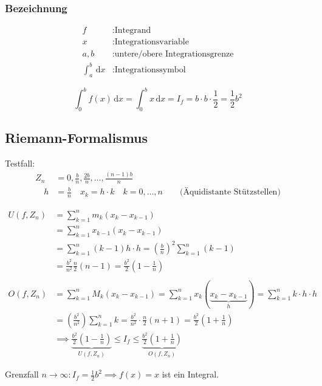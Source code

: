\subsubsection{Bezeichnung}
\begin{align*}
	f&: \text{Integrand} \\
	x&: \text{Integrationsvariable}\\
	a,b&: \text{untere/obere Integrationsgrenze}\\	
	\int_a^b \,\mathrm{d}x &:\text{Integrationssymbol}
\end{align*}

\begin{example}[f(x)=x in \lbrack0,b\rbrack]
	\[
		\int_0^b f(x) \,\mathrm{d}x = \int_0^b x \,\mathrm{d}x = I_f = b \cdot b \cdot \frac{1}{2} = \frac{1}{2} b^2
	\]
\end{example}


\subsection{Riemann-Formalismus}
Testfall:
\begin{align*}
	Z_n &= {0,\frac{b}{n},\frac{2b}{n},\ldots,\frac{(n-1)b}{n}} \\
	\quad h &= \frac{b}{n} \quad x_k=h \cdot k \quad k=0,\ldots,n \qquad \text{(Äquidistante Stützstellen)} 
\end{align*}

\begin{align*}
	U(f,Z_n) 
	&= \sum_{k=1}^n m_k(x_k-x_{k-1}) \\
	&= \sum_{k=1}^n x_{k-1}(x_k-x_{k-1}) \\
	&= \sum_{k=1}^n (k-1)h \cdot h = \left( \frac{b}{n} \right)^2 \sum_{k=1}^n (k-1) \\
	&= \frac{b^2}{n^2} \frac{n}{2}(n-1) = \frac{b^2}{2}(1-\frac{1}{n}) \\
	\\
	O(f,Z_n)
	&=\sum_{k=1}^n M_k(x_k-x_{k-1}) = \sum_{k=1}^n x_k(\underbrace{x_k-x_{k-1}}_{h}) = \sum_{k=1}^n k \cdot h \cdot h \\
	&= \left(\frac{b^2}{n^2}\right)\sum_{k=1}^n k = \frac{b^2}{n^2} \cdot \frac{n}{2}(n+1) = \frac{b^2}{2}(1+\frac{1}{n}) \\
	&\implies \underbrace{ \frac{b^2}{2}(1-\frac{1}{n}) }_{U(f,Z_n)}\leq I_f \leq \underbrace{\frac{b^2}{2}(1+\frac{1}{n})}_{O(f,Z_n)}
\end{align*}

Grenzfall \( n \rightarrow \infty : I_f = \frac{1}{2}b^2 \implies f(x) = x \) ist ein Integral.

